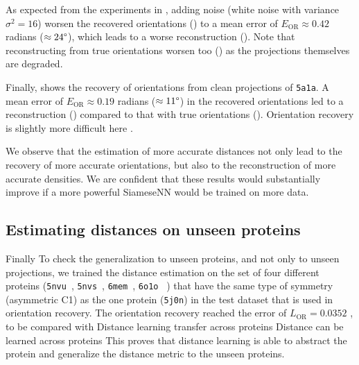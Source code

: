 As expected from the experiments in , adding noise (white noise with variance $\sigma^2=16$) worsen the recovered orientations () to a mean error of $E_\text{OR} \approx 0.42$ radians ($\approx 24\degree$), which leads to a worse reconstruction ().
Note that reconstructing from true orientations worsen too  () as the projections themselves are degraded.

Finally,  shows the recovery of orientations from clean projections of \texttt{5a1a}.
A mean error of $E_\text{OR} \approx 0.19$ radians ($\approx 11\degree$) in the recovered orientations led to a  reconstruction () compared to that with true orientations ().
Orientation recovery is slightly more difficult here  .

We observe that the estimation of more accurate distances not only lead to the recovery of more accurate orientations, but also to the reconstruction of more accurate densities.
We are confident that these results would substantially improve if a more powerful SiameseNN would be trained on more data.

\subsection{Estimating distances on unseen proteins}


Finally
To check the generalization to unseen proteins, and not only to  unseen projections, we trained the distance estimation on the set of four different proteins (\texttt{5nvu}~\cite{5nvu_pdb}, \texttt{5nvs}~\cite{5nvs_pdb}, \texttt{6mem}~\cite{6mem_pdb}, \texttt{6o1o}~\cite{6o1o_pdb} ) that have the same type of symmetry (asymmetric  C1) as the one protein (\texttt{5j0n}) in the test dataset that is used in orientation recovery.
The orientation recovery reached the error of $L_\text{OR} = 0.0352$ ,
to be compared with
Distance learning transfer across proteins Distance can be learned across proteins
This proves that distance learning is able to abstract the protein and generalize the distance metric to the unseen proteins.
